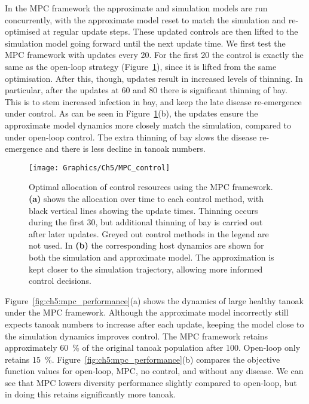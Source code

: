 In the MPC framework the approximate and simulation models are run concurrently, with the approximate model reset to match the simulation and re-optimised at regular update steps. These updated controls are then lifted to the simulation model going forward until the next update time. We first test the MPC framework with updates every \SI{20}{\years}. For the first \SI{20}{\years} the control is exactly the same as the open-loop strategy (Figure~\ref{fig:ch5:mpc_strat}), since it is lifted from the same optimisation. After this, though, updates result in increased levels of thinning. In particular, after the updates at 60 and \SI{80}{\years} there is significant thinning of bay. This is to stem increased infection in bay, and keep the late disease re-emergence under control. As can be seen in Figure~\ref{fig:ch5:mpc_strat}(b), the updates ensure the approximate model dynamics more closely match the simulation, compared to under open-loop control. The extra thinning of bay slows the disease re-emergence and there is less decline in tanoak numbers.

\begin{figure}[!t]
    \begin{center}
        \texttt{[image: Graphics/Ch5/MPC\_control]}
        \caption[MPC control strategy]{Optimal allocation of control resources using the MPC framework. \textbf{(a)} shows the allocation over time to each control method, with black vertical lines showing the update times. Thinning occurs during the first \SI{30}{\years}, but additional thinning of bay is carried out after later updates. Greyed out control methods in the legend are not used. In \textbf{(b)} the corresponding host dynamics are shown for both the simulation and approximate model. The approximation is kept closer to the simulation trajectory, allowing more informed control decisions. \label{fig:ch5:mpc_strat}}
    \end{center}
\end{figure}

Figure~\ref{fig:ch5:mpc_performance}(a) shows the dynamics of large healthy tanoak under the MPC framework. Although the approximate model incorrectly still expects tanoak numbers to increase after each update, keeping the model close to the simulation dynamics improves control. The MPC framework retains approximately \SI{60}{\percent} of the original tanoak population after \SI{100}{\years}. Open-loop only retains \SI{15}{\percent}. Figure~\ref{fig:ch5:mpc_performance}(b) compares the objective function values for open-loop, MPC, no control, and without any disease. We can see that MPC lowers diversity performance slightly compared to open-loop, but in doing this retains significantly more tanoak.

